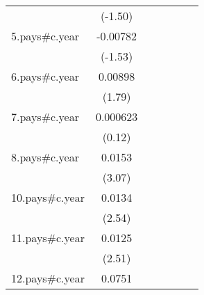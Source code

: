 {\begin{tabular}{l*{6}{c}}
                    &     (-1.50)         &                     &                     &                     &                     &                     \\
[1em]
5.pays#c.year       &    -0.00782         &                     &                     &                     &                     &                     \\
                    &     (-1.53)         &                     &                     &                     &                     &                     \\
[1em]
6.pays#c.year       &     0.00898         &                     &                     &                     &                     &                     \\
                    &      (1.79)         &                     &                     &                     &                     &                     \\
[1em]
7.pays#c.year       &    0.000623         &                     &                     &                     &                     &                     \\
                    &      (0.12)         &                     &                     &                     &                     &                     \\
[1em]
8.pays#c.year       &      0.0153\sym{**} &                     &                     &                     &                     &                     \\
                    &      (3.07)         &                     &                     &                     &                     &                     \\
[1em]
10.pays#c.year      &      0.0134\sym{*}  &                     &                     &                     &                     &                     \\
                    &      (2.54)         &                     &                     &                     &                     &                     \\
[1em]
11.pays#c.year      &      0.0125\sym{*}  &                     &                     &                     &                     &                     \\
                    &      (2.51)         &                     &                     &                     &                     &                     \\
[1em]
12.pays#c.year      &      0.0751\sym{***}&                     &                     &                     &                     &                     \\

\end{tabular}}
